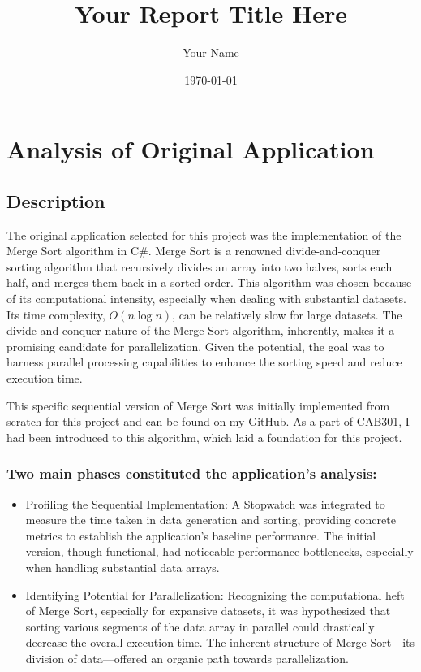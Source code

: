 \documentclass[12pt]{article}
\title{Your Report Title Here}
\author{Your Name}
\date{\today}
\begin{document}
    \maketitle


    \section{Analysis of Original Application}

    \subsection{Description}
    The original application selected for this project was the implementation of the Merge Sort
    algorithm in C\#. Merge Sort is a renowned divide-and-conquer sorting algorithm that
    recursively divides an array into two halves, sorts each half, and merges them back in a
    sorted order. This algorithm was chosen because of its computational intensity, especially
    when dealing with substantial datasets. Its time complexity, $O(n \log n)$, can be relatively
    slow for large datasets. The divide-and-conquer nature of the Merge Sort algorithm, 
    inherently, makes it a promising candidate for parallelization. Given the potential, the 
    goal was to harness parallel processing capabilities to enhance the sorting speed and reduce
    execution time.

    This specific sequential version of Merge Sort was initially implemented from scratch
    for this project and can be found on my \href{https://github.com/CurtisDH/MergeSort}{GitHub}. As a part of CAB301, 
    I had been introduced to this algorithm, which laid a foundation for this project.

    \subsubsection{Two main phases constituted the application's analysis:}
    \begin{itemize}
        \item Profiling the Sequential Implementation: A Stopwatch was integrated to measure the time taken in data generation and sorting, providing concrete metrics to establish the application's baseline performance. The initial version, though functional, had noticeable performance bottlenecks, especially when handling substantial data arrays.
        \item Identifying Potential for Parallelization: Recognizing the computational heft of Merge Sort, especially for expansive datasets, it was hypothesized that sorting various segments of the data array in parallel could drastically decrease the overall execution time. The inherent structure of Merge Sort—its division of data—offered an organic path towards parallelization.
    \end{itemize}
\end{document}
